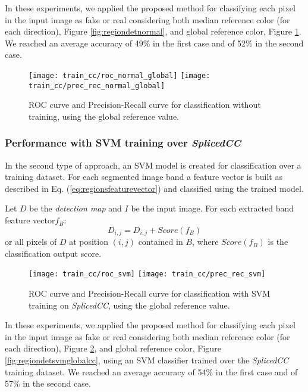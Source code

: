 In these experiments, we applied the proposed method for classifying each pixel in the input image as fake or real considering both median reference color (for each direction), Figure \ref{fig:regiondetnormal}, and global reference color, Figure \ref{fig:regiondetnormalglobal}. We reached an average accuracy of 49\% in the first case and of 52\% in the second case.

\begin{figure}[!htb]
  \texttt{[image: train\_cc/roc\_normal\_global]}
\endminipage\hfill
{}
  \texttt{[image: train\_cc/prec\_rec\_normal\_global]}
\endminipage
\caption{ROC curve and Precision-Recall curve for classification without training, using the global reference value.}\label{fig:regiondetnormalglobal}
\end{figure}

\subsubsection{Performance with SVM training over \emph{SplicedCC}}

In the second type of approach, an SVM model is created for classification over a training dataset. For each segmented image band a feature vector is built as described in Eq. (\ref{eq:regionsfeaturevector}) and classified using the trained model.

Let $D$ be the \emph{detection map} and $I$ be the input image. For each extracted band feature vector$f_B$:
$$
D_{i, j} = D_{i, j} + Score(f_B)
$$
or all pixels of $D$ at position $(i, j)$ contained in $B$, where $Score(f_B)$ is the classification output score.

\begin{figure}[!htb]
  \texttt{[image: train\_cc/roc\_svm]}
\endminipage\hfill
{}
  \texttt{[image: train\_cc/prec\_rec\_svm]}
\endminipage
\caption{ROC curve and Precision-Recall curve for classification with SVM training on \emph{SplicedCC}, using the global reference value.}\label{fig:regiondetsvmcc}
\end{figure}

In these experiments, we applied the proposed method for classifying each pixel in the input image as fake or real considering both median reference color (for each direction), Figure \ref{fig:regiondetsvmcc}, and global reference color, Figure \ref{fig:regiondetsvmglobalcc}, using an SVM classifier trained over the \emph{SplicedCC} training dataset. We reached an average accuracy of 54\% in the first case and of 57\% in the second case.

